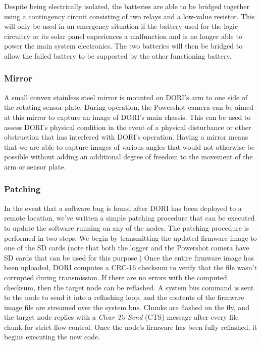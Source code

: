     Despite being electrically isolated, the batteries are able to be bridged together using a contingency circuit consisting of two relays and a low-value resistor. This will only be used in an emergency situation if the battery used for the logic circuitry or its solar panel experiences a malfunction and is no longer able to power the main system electronics. The two batteries will then be bridged to allow the failed battery to be supported by the other functioning battery.

    \subsubsection*{Mirror}
    A small convex stainless steel mirror is mounted on DORI's arm to one side of the rotating sensor plate. During operation, the Powershot camera can be aimed at this mirror to capture an image of DORI's main chassis. This can be used to assess DORI's physical condition in the event of a physical disturbance or other obstruction that has interfered with DORI's operation. Having a mirror means that we are able to capture images of various angles that would not otherwise be possible without adding an additional degree of freedom to the movement of the arm or sensor plate.

    \subsubsection*{Patching}
In the event that a software bug is found after DORI has been deployed to a remote location, we've written a simple patching procedure that can be executed to update the software running on any of the nodes. 
The patching procedure is performed in two steps. We begin by transmitting the updated firmware image to one of the SD cards (note that both the logger and the Powershot camera have SD cards that can be used for this purpose.) Once the entire firmware image has been uploaded, DORI computes a CRC-16 checksum to verify that the file wasn't corrupted during transmission. If there are no errors with the computed checksum, then the target node can be reflashed. A system bus command is sent to the node to send it into a reflashing loop, and the contents of the firmware image file are streamed over the system bus. Chunks are flashed on the fly, and the target node replies with a \emph{Clear To Send} (CTS) message after every file chunk for strict flow control. Once the node's firmware has been fully reflashed, it begins executing the new code.


